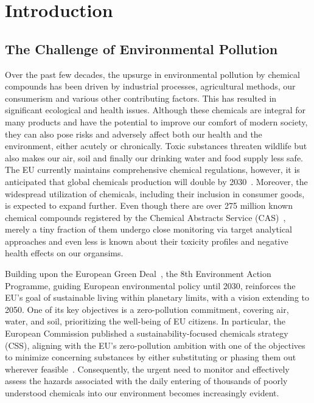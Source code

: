 \newcommand{\package}{\emph}

\chapter{Introduction}\label{chap:introduction}

\section{The Challenge of Environmental Pollution}

Over the past few decades, the upsurge in environmental pollution by chemical compounds has been driven by industrial processes, agricultural methods, our consumerism and various other contributing factors. This has resulted in significant ecological and health issues. Although these chemicals are integral for many products and have the potential to improve our comfort of modern society, they can also pose risks and adversely affect both our health and the environment, either acutely or chronically. Toxic substances threaten wildlife but also makes our air, soil and finally our drinking water and food supply less safe. The EU currently maintains comprehensive chemical regulations, however, it is anticipated that global chemicals production will double by 2030~\cite{chemicaloutlook}. Moreover, the widespread utilization of chemicals, including their inclusion in consumer goods, is expected to expand further.
Even though there are over 275 million known chemical compounds registered by the Chemical Abstracts Service (CAS)~\cite{CAS}, merely a tiny fraction of them undergo close monitoring via target analytical approaches and even less is known about their toxicity profiles and negative health effects on our organsims.

Building upon the European Green Deal~\cite{greendeal}, the 8th Environment Action Programme, guiding European environmental policy until 2030, reinforces the EU's goal of sustainable living within planetary limits, with a vision extending to 2050. One of its key objectives is a zero-pollution commitment, covering air, water, and soil, prioritizing the well-being of EU citizens. In particular, the European Commission published a sustainability-focused chemicals strategy (CSS), aligning with the EU's zero-pollution ambition with one of the objectives to minimize concerning substances by either substituting or phasing them out wherever feasible~\cite{EUChemicalsStrategy}. 
Consequently, the urgent need to monitor and effectively assess the hazards associated with the daily entering of thousands of poorly understood chemicals into our environment becomes increasingly evident.

